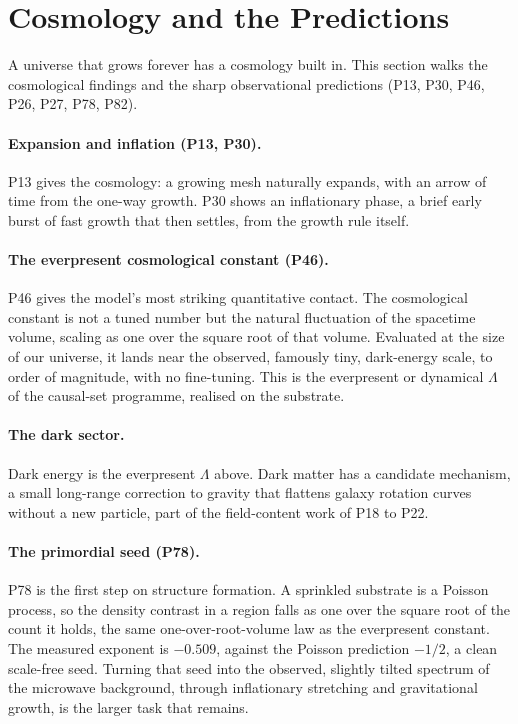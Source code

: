 \section{Cosmology and the Predictions}
\label{sec:cosmology}

A universe that grows forever has a cosmology built in. This section walks the cosmological findings
and the sharp observational predictions (P13, P30, P46, P26, P27, P78, P82).

\paragraph{Expansion and inflation (P13, P30).}
P13 gives the cosmology: a growing mesh naturally expands, with an arrow of time from the one-way
growth. P30 shows an inflationary phase, a brief early burst of fast growth that then settles, from
the growth rule itself.

\paragraph{The everpresent cosmological constant (P46).}
P46 gives the model's most striking quantitative contact. The cosmological constant is not a tuned
number but the natural fluctuation of the spacetime volume, scaling as one over the square root of
that volume. Evaluated at the size of our universe, it lands near the observed, famously tiny,
dark-energy scale, to order of magnitude, with no fine-tuning. This is the everpresent or dynamical
$\Lambda$ of the causal-set programme, realised on the substrate.

\paragraph{The dark sector.}
Dark energy is the everpresent $\Lambda$ above. Dark matter has a candidate mechanism, a small
long-range correction to gravity that flattens galaxy rotation curves without a new particle, part
of the field-content work of P18 to P22.

\paragraph{The primordial seed (P78).}
P78 is the first step on structure formation. A sprinkled substrate is a Poisson process, so the
density contrast in a region falls as one over the square root of the count it holds, the same
one-over-root-volume law as the everpresent constant. The measured exponent is $-0.509$, against the
Poisson prediction $-1/2$, a clean scale-free seed. Turning that seed into the observed, slightly
tilted spectrum of the microwave background, through inflationary stretching and gravitational
growth, is the larger task that remains.


